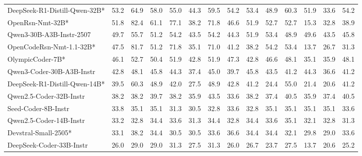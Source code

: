 \begin{table}[hbt]
{\begin{tabular}{l *{13}{c}}
DeepSeek-R1-Distill-Qwen-32B* & 	53.2 &  64.9 &  58.0 &  55.0 &  44.3 &  59.5 &  54.2 &  53.4 &  48.9 &  60.3 &  51.9 &  33.6 &  54.2\\ 										
\rowcolor{gray!10}
OpenRsn-Nmt-32B* & 	51.8 &  82.4 &  61.1 &  77.1 &  38.2 &  71.8 &  46.6 &  51.9 &  52.7 &  52.7 &  15.3 &  32.8 &  38.9\\ 											
Qwen3-30B-A3B-Instr-2507&	49.7 &  55.7 &  51.2 &  54.2 &  43.5 &  54.2 &  44.3 &  51.9 &  53.4 &  48.9 &  49.6 &  43.5 &  45.8\\ 											
\rowcolor{gray!10}
OpenCodeRsn-Nmt-1.1-32B* & 	47.5 &  81.7 &  51.2 &  71.8 &  35.1 &  71.0 &  41.2 &  38.2 &  54.2 &  53.4 &  13.7 &  26.7 &  31.3\\ 											
OlympicCoder-7B* & 	46.1 &  52.7 &  50.4 &  51.9 &  42.8 &  51.9 &  47.3 &  42.8 &  46.6 &  48.1 &  35.1 &  35.9 &  48.1\\ 											
\rowcolor{gray!10}
Qwen3-Coder-30B-A3B-Instr & 42.8 &  48.1 &  45.8 &  44.3 &  37.4 &  45.0 &  39.7 &  45.8 &  43.5 &  41.2 &  44.3 &  36.6 &  41.2\\ 											
DeepSeek-R1-Distill-Qwen-14B* & 	39.5 &  60.3 &  48.9 &  42.0 &  27.5 &  48.9 &  42.8 &  41.2 &  24.4 &  55.0 &  21.4 &  20.6 &  41.2\\ 										
\rowcolor{gray!10}
Qwen2.5-Coder-32B-Instr & 38.2 &  38.2 &  39.7 &  38.2 &  35.9 &  43.5 &  33.6 &  38.2 &  37.4 &  40.5 &  35.9 &  37.4 &  40.5\\ 											
Seed-Coder-8B-Instr & 33.8 &  35.1 &  35.1 &  31.3 &  30.5 &  32.8 &  33.6 &  32.8 &  35.1 &  35.1 &  35.1 &  35.1 &  33.6\\ 											
\rowcolor{gray!10}
Qwen2.5-Coder-14B-Instr & 33.2 &  32.8 &  34.4 &  33.6 &  31.3 &  34.4 &  32.8 &  34.4 &  33.6 &  35.1 &  32.1 &  32.8 &  31.3\\ 											
Devstral-Small-2505* &	33.1 &  38.2 &  34.4 &  30.5 &  30.5 &  33.6 &  36.6 &  34.4 &  34.4 &  32.1 &  29.8 &  29.0 &  33.6\\ 											
\rowcolor{gray!10}
DeepSeek-Coder-33B-Instr & 26.0 &  29.0 &  29.0 &  31.3 &  27.5 &  31.3 &  26.0 &  26.7 &  23.7 &  27.5 &  13.7 &  20.6 &  25.2\\ 											

\bottomrule
\end{tabular}
}
\end{table}
